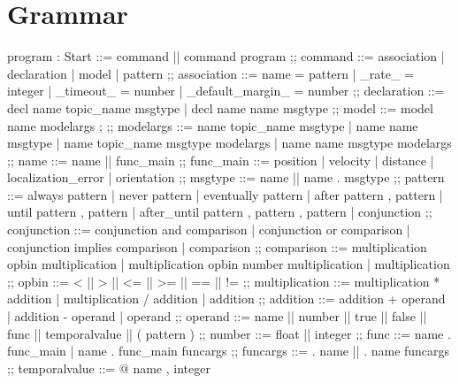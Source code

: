 \section{Grammar}

\begin{bnfgrammar}  %
    program : Start
    ::=
    command || command program
    ;;
    command ::=
    association
    | declaration
    | model
    | pattern
    ;; 
    association ::=
    name = pattern
    | \_rate\_ = integer
    | \_timeout\_ = number
    | \_default\_margin\_ = number
    ;;
    declaration ::=
    decl name topic\_name msgtype
    | decl name name msgtype
    ;;
    model ::= 
    model name \: modelargs ; %
    ;;
    modelargs ::= 
    name topic\_name msgtype
    | name name msgtype
    | name topic\_name msgtype modelargs
    | name name msgtype modelargs
    ;;
    name ::= 
    name || func\_main
    ;;
    func\_main ::= 
    position
    | velocity
    | distance
    | localization\_error
    | orientation
    ;;
    msgtype ::= 
    name || name . msgtype
    ;;
    pattern ::= 
    always pattern
    | never pattern
    | eventually pattern
    | after pattern , pattern
    | until pattern , pattern
    | after\_until pattern , pattern , pattern
    | conjunction
    ;;
    conjunction ::= 
    conjunction and comparison
    | conjunction or comparison
    | conjunction implies comparison
    | comparison
    ;;
    comparison ::= 
    multiplication opbin multiplication
    | multiplication opbin { number } multiplication
    | multiplication
    ;;
    opbin ::= 
    < || > || <= || >= || == || !=
    ;;
    multiplication ::= 
    multiplication * addition
    | multiplication / addition
    | addition
    ;;
    addition ::= addition + operand
    | addition - operand
    | operand
    ;;
    operand ::= 
    name || number || true || false || func || temporalvalue || ( pattern )
    ;;
    number ::= 
    float || integer
    ;;
    func ::= 
    name . func\_main
    | name . func\_main funcargs
    ;;
    funcargs ::= 
    . name || . name funcargs
    ;;
    temporalvalue ::= 
    @ { name , integer }
\end{bnfgrammar}

